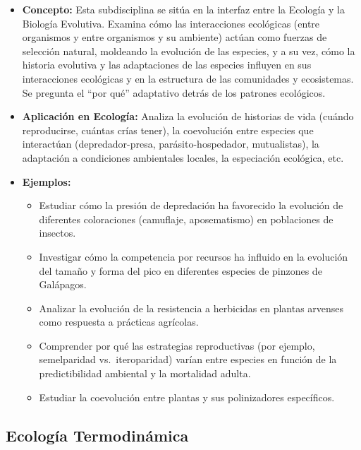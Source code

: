 \documentclass[
]{book}
\providecommand{\tightlist}{%
  \setlength{\itemsep}{0pt}\setlength{\parskip}{0pt}}
\begin{document}
\begin{itemize}
\tightlist
\item
  \textbf{Concepto:} Esta subdisciplina se sitúa en la interfaz entre la Ecología y la Biología Evolutiva. Examina cómo las interacciones ecológicas (entre organismos y entre organismos y su ambiente) actúan como fuerzas de selección natural, moldeando la evolución de las especies, y a su vez, cómo la historia evolutiva y las adaptaciones de las especies influyen en sus interacciones ecológicas y en la estructura de las comunidades y ecosistemas. Se pregunta el ``por qué'' adaptativo detrás de los patrones ecológicos.
\item
  \textbf{Aplicación en Ecología:} Analiza la evolución de historias de vida (cuándo reproducirse, cuántas crías tener), la coevolución entre especies que interactúan (depredador-presa, parásito-hospedador, mutualistas), la adaptación a condiciones ambientales locales, la especiación ecológica, etc.
\item
  \textbf{Ejemplos:}

  \begin{itemize}
  \tightlist
  \item
    Estudiar cómo la presión de depredación ha favorecido la evolución de diferentes coloraciones (camuflaje, aposematismo) en poblaciones de insectos.
  \item
    Investigar cómo la competencia por recursos ha influido en la evolución del tamaño y forma del pico en diferentes especies de pinzones de Galápagos.
  \item
    Analizar la evolución de la resistencia a herbicidas en plantas arvenses como respuesta a prácticas agrícolas.
  \item
    Comprender por qué las estrategias reproductivas (por ejemplo, semelparidad vs.~iteroparidad) varían entre especies en función de la predictibilidad ambiental y la mortalidad adulta.
  \item
    Estudiar la coevolución entre plantas y sus polinizadores específicos.
  \end{itemize}
\end{itemize}

\subsection*{\texorpdfstring{\textbf{Ecología Termodinámica}}{Ecología Termodinámica}}\label{termodin}
\end{document}
